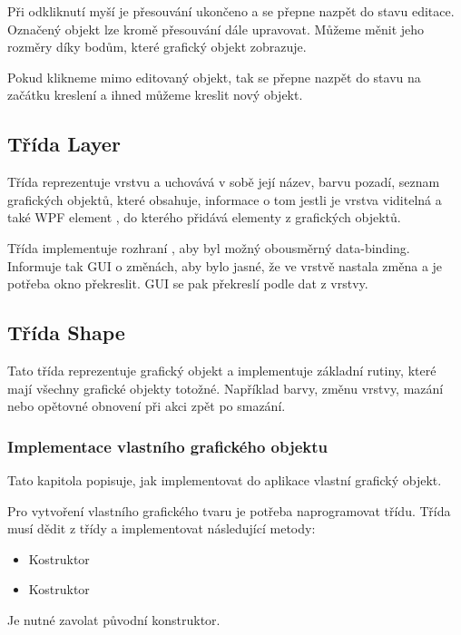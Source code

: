 \documentclass[
  field=inf,
  biblatex,
  glossaries,
  index
]{kidiplom}
\begin{document}
Při odkliknutí myší je přesouvání ukončeno a  se přepne nazpět do stavu editace. Označený objekt lze kromě přesouvání dále upravovat. Můžeme měnit jeho rozměry díky bodům, které grafický objekt zobrazuje.

Pokud klikneme mimo editovaný objekt, tak se  přepne nazpět do stavu na začátku kreslení a ihned můžeme kreslit nový objekt.

\subsection{Třída Layer}

Třída  reprezentuje vrstvu a uchovává v sobě její název, barvu pozadí, seznam grafických objektů, které obsahuje, informace o tom jestli je vrstva viditelná a také WPF element , do kterého přidává elementy z grafických objektů. 

Třída implementuje rozhraní , aby byl možný obousměrný data-binding. Informuje tak GUI o změnách, aby bylo jasné, že ve vrstvě nastala změna a je potřeba okno překreslit. GUI se pak překreslí podle dat z vrstvy.

\subsection{Třída Shape}

Tato třída reprezentuje grafický objekt a implementuje základní rutiny, které mají všechny grafické objekty totožné. Například barvy, změnu vrstvy, mazání nebo opětovné obnovení při akci zpět po smazání.

\subsubsection{Implementace vlastního grafického objektu}

Tato kapitola popisuje, jak implementovat do aplikace vlastní grafický objekt.

Pro vytvoření vlastního grafického tvaru je potřeba naprogramovat třídu. Třída musí dědit z třídy  a implementovat následující metody:

\begin{itemize}
\item Kostruktor 
\item Kostruktor 
\end{itemize}
Je nutné zavolat původní konstruktor.
\end{document}
